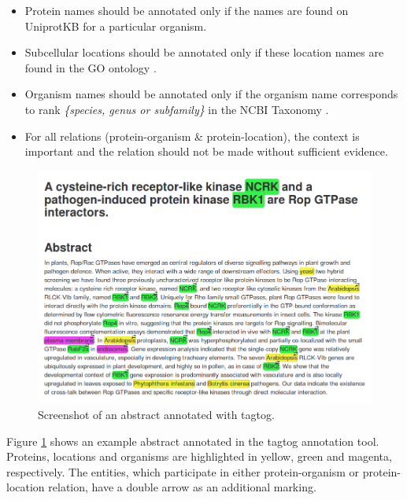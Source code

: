 \begin{itemize}

\item Protein names should be annotated only if the names are found on UniprotKB \cite{magrane2011uniprot} for a particular organism.

\item Subcellular locations should be annotated only if these location names are found in the GO ontology \cite{ashburner2000gene}.

\item Organism names should be annotated only if the organism name corresponds to rank \emph{\{species, genus or subfamily\}} in the NCBI Taxonomy \cite{ncbiTaxonomy}.

\item For all relations (protein-organism \& protein-location), the context is important and the relation should not be made without sufficient evidence.

\end{itemize}


\begin{figure}
\centering
\includegraphics[scale=0.4]{figures/tagtog_screenshot.png}
\caption{Screenshot of an abstract annotated with tagtog.}\label{fig:tagtogScreenshot}
\end{figure}

Figure \ref{fig:tagtogScreenshot} shows an example abstract annotated in the tagtog annotation tool. Proteins, locations and organisms are highlighted in yellow, green and magenta, respectively. The entities, which participate in either protein-organism or protein-location relation, have a double arrow as an additional marking.


